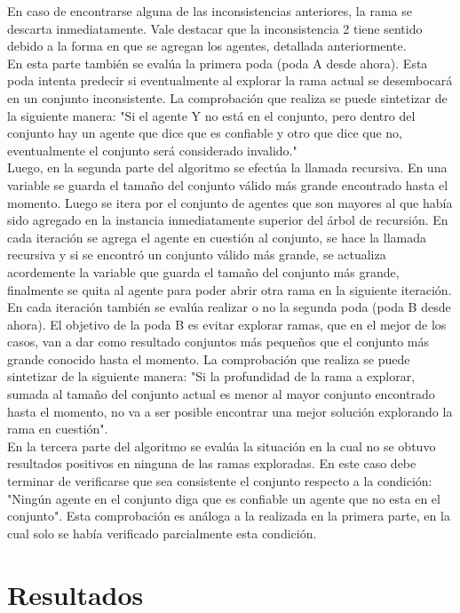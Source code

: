 \documentclass{article}
\begin{document}
En caso de encontrarse alguna de las inconsistencias anteriores, la rama se descarta inmediatamente. Vale destacar que la inconsistencia 2 tiene sentido debido a la forma en que se agregan los agentes, detallada anteriormente. \\
En esta parte también se evalúa la primera poda (poda A desde ahora). Esta poda intenta predecir si eventualmente al explorar la rama actual se desembocará en un conjunto inconsistente. La comprobación que realiza se puede sintetizar de la siguiente manera: "Si el agente Y no está en el conjunto, pero dentro del conjunto hay un agente que dice que es confiable y otro que dice que no, eventualmente el conjunto será considerado invalido." \\
Luego, en la segunda parte del algoritmo se efectúa la llamada recursiva. En una variable se guarda el tamaño del conjunto válido más grande encontrado hasta el momento. Luego se itera por el conjunto de agentes que son mayores al que había sido agregado en la instancia inmediatamente superior del árbol de recursión. En cada iteración se agrega el agente en cuestión al conjunto, se hace la llamada recursiva y si se encontró un conjunto válido más grande, se actualiza acordemente la variable que guarda el tamaño del conjunto más grande, finalmente se quita al agente para poder abrir otra rama en la siguiente iteración. \\
En cada iteración también se evalúa realizar o no la segunda poda (poda B desde ahora). El objetivo de la poda B es evitar explorar ramas, que en el mejor de los casos, van a dar como resultado conjuntos más pequeños que el conjunto más grande conocido hasta el momento. La comprobación que realiza se puede sintetizar de la siguiente manera: "Si la profundidad de la rama a explorar, sumada al tamaño del conjunto actual es menor al mayor conjunto encontrado hasta el momento, no va a ser posible encontrar una mejor solución explorando la rama en cuestión".\\
En la tercera parte del algoritmo se evalúa la situación en la cual no se obtuvo resultados positivos en ninguna de las ramas exploradas. En este caso debe terminar de verificarse que sea consistente el conjunto respecto a la condición: "Ningún agente en el conjunto diga que es confiable un agente que no esta en el conjunto". Esta comprobación es análoga a la realizada en la primera parte, en la cual solo se había verificado parcialmente esta condición.

\section{Resultados}
\end{document}
